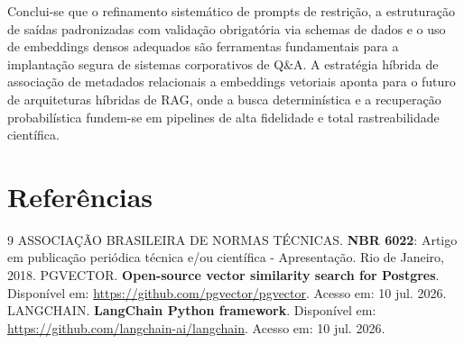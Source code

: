 \documentclass[12pt,a4paper]{article}
\begin{document}
Conclui-se que o refinamento sistemático de prompts de restrição, a estruturação de saídas padronizadas com validação obrigatória via schemas de dados e o uso de embeddings densos adequados são ferramentas fundamentais para a implantação segura de sistemas corporativos de Q\&A. A estratégia híbrida de associação de metadados relacionais a embeddings vetoriais aponta para o futuro de arquiteturas híbridas de RAG, onde a busca determinística e a recuperação probabilística fundem-se em pipelines de alta fidelidade e total rastreabilidade científica.

\section{Referências}
\begin{thebibliography}{9}
  ASSOCIAÇÃO BRASILEIRA DE NORMAS TÉCNICAS. \textbf{NBR 6022}: Artigo em publicação periódica técnica e/ou científica - Apresentação. Rio de Janeiro, 2018.
  PGVECTOR. \textbf{Open-source vector similarity search for Postgres}. Disponível em: \url{https://github.com/pgvector/pgvector}. Acesso em: 10 jul. 2026.
  LANGCHAIN. \textbf{LangChain Python framework}. Disponível em: \url{https://github.com/langchain-ai/langchain}. Acesso em: 10 jul. 2026.
\end{thebibliography}
\end{document}
